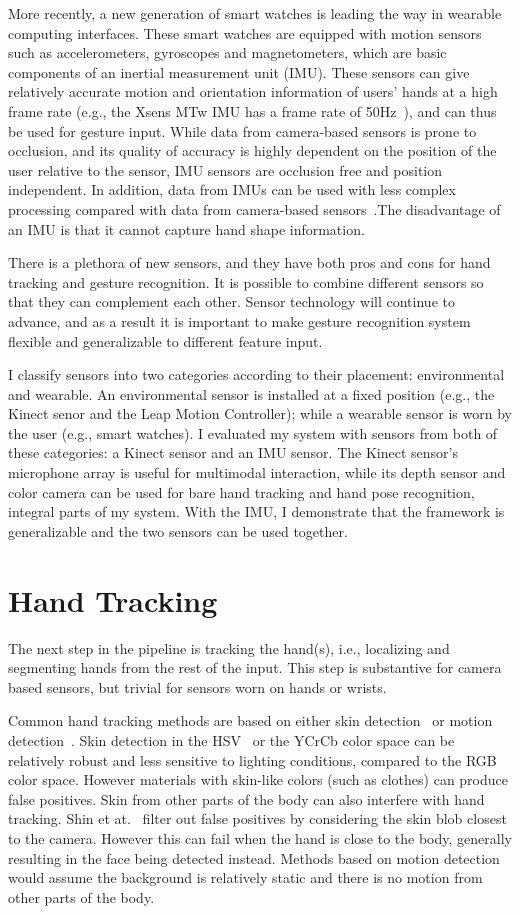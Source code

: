 More recently, a new generation of smart watches is leading the way in wearable
computing interfaces.
These smart watches are equipped with motion sensors such as
accelerometers, gyroscopes and magnetometers, which are basic components of an
inertial measurement
unit
(IMU). These sensors can give relatively accurate motion and orientation
information of users' hands at a high frame rate (e.g., the Xsens MTw IMU has
a frame rate of 50Hz~\cite{Ruffieux2013}), and can thus be used for
gesture input.
While data from camera-based sensors is prone to occlusion, and its quality
of accuracy is highly dependent on the position of the user relative to the
sensor, IMU sensors are occlusion free and position independent. In
addition, data from IMUs can be used with less complex processing
compared with data from camera-based sensors~\cite{Ruffieux2013}.The
disadvantage of an IMU is that it cannot capture hand shape information.

There is a plethora of new sensors, and they have both pros and cons for hand
tracking and gesture recognition. It is possible to combine different sensors
so that they can complement each other. Sensor technology will continue to
advance, and as a result it is important to make gesture recognition system
 flexible and generalizable to different feature input. 

I classify
sensors into two categories according to their placement:
environmental and wearable. An environmental sensor is installed at a fixed
position (e.g., the Kinect senor and the Leap Motion Controller); while a
wearable sensor is worn by the user (e.g., smart watches). I
evaluated my system with sensors from both of these categories: a Kinect
sensor and an IMU sensor.
The Kinect sensor's microphone array is
useful for multimodal interaction, while its depth sensor and color camera can
be used for bare hand tracking and hand pose recognition, integral
parts of my system. With
the IMU, I demonstrate that the framework is generalizable and the two sensors can be used together.

\section{Hand Tracking}
The next step in the pipeline is
tracking the hand(s), i.e., localizing and segmenting hands from the rest of
the input. This step is substantive for camera based sensors, but trivial
for sensors worn on hands or wrists. 

Common hand tracking methods are based on either skin detection~\cite{shin04} or
motion detection~\cite{cutler98}.
Skin detection in the HSV~\cite{bradski98} or the YCrCb color space can be
relatively robust and less sensitive to lighting conditions, compared to the RGB
color space. However materials with skin-like colors (such as clothes) can produce false positives. Skin from other parts of the body can also interfere with hand tracking. 
Shin et at.~\cite{shin04} filter out false positives by considering the skin blob closest to the camera. However this can fail when the hand is close to
the body, generally resulting in the face being detected instead. Methods based
on motion detection would assume the background is relatively static and
there is no motion from other parts of the body. 

